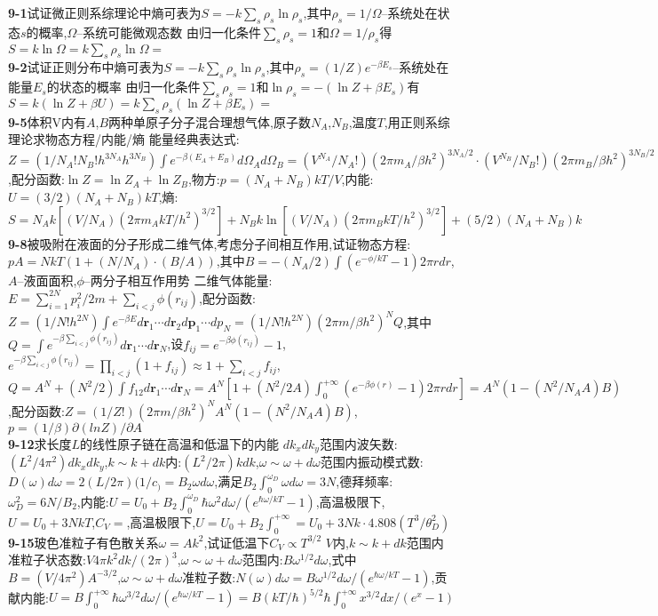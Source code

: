 \documentclass[10pt,a4paper]{article}
\begin{document}
\begin{multicols}{2}
\textbf{9-1}试证微正则系综理论中熵可表为$S=-k\sum_s\rho_s\ln\rho_s$,其中$\rho_s=1/\Omega$--系统处在状态$s$的概率,$\Omega$--系统可能微观态数\quad\quad
由归一化条件$\sum_s\rho_s=1$和$\Omega=1/\rho_s$得$S=k\ln\Omega=k\sum_s\rho_s\ln\Omega=$\\
\textbf{9-2}试证正则分布中熵可表为$S=-k\sum_s\rho_s\ln\rho_s$,其中$\rho_s=(1/Z)e^{-\beta E_s}$--系统处在能量$E_s$的状态的概率\quad\quad
由归一化条件$\sum_s\rho_s=1$和$\ln\rho_s=-(\ln Z+\beta E_s)$有$S=k(\ln Z+\beta U)=k\sum_s\rho_s(\ln Z+\beta E_s)=$\\
\textbf{9-5}体积V内有$A$,$B$两种单原子分子混合理想气体,原子数$N_A$,$N_B$,温度$T$,用正则系综理论求物态方程/内能/熵\quad\quad
能量经典表达式:$Z=(1/N_A!N_B!h^{3N_A}h^{3N_B})\int e^{-\beta(E_A+E_B)}d\Omega_Ad\Omega_B=(V^{N_A}/N_A!)(2\pi m_A/\beta h^2)^{3N_A/2}\cdot(V^{N_B}/N_B!)(2\pi m_B/\beta h^2)^{3N_B/2}$,配分函数:$\ln Z=\ln Z_A+\ln Z_B$,物方:$p=(N_A+N_B)kT/V$,内能:$U=(3/2)(N_A+N_B)kT$,熵:$S=N_Ak[(V/N_A)(2\pi m_AkT/h^2)^{3/2}]+N_Bk\ln[(V/N_A)(2\pi m_BkT/h^2)^{3/2}]+(5/2)(N_A+N_B)k$\\
\textbf{9-8}被吸附在液面的分子形成二维气体,考虑分子间相互作用,试证物态方程:$pA=NkT(1+(N/N_A)\cdot(B/A))$,其中$B=-(N_A/2)\int(e^{-\phi/kT}-1)2\pi rdr$,$A$--液面面积,$\phi$--两分子相互作用势\quad\quad
二维气体能量:$E=\sum_{i=1}^{2N}p_i^2/2m+\sum_{i<j}\phi(r_{ij})$,配分函数:$Z=(1/N!h^{2N})\int e^{-\beta E}d\bm{r}_1\cdots d\bm{r}_2d\bm{p}_1\cdots dp_N=(1/N!h^{2N})(2\pi m/\beta h^2)^NQ$,其中$Q=\int e^{-\beta\sum_{i<j}\phi(r_{ij})}d\bm{r}_1\cdots d\bm{r}_N$,设$f_{ij}=e^{-\beta\phi(r_{ij})}-1$,$e^{-\beta\sum_{i<j}\phi(r_{ij})}=\prod_{i<j}(1+f_{ij})\approx1+\sum_{i<j}f_{ij}$,$Q=A^N+(N^2/2)\int f_{12}d\bm{r}_1\cdots d\bm{r}_N=A^N[1+(N^2/2A)\int_0^{+\infty}(e^{-\beta\phi(r)}-1)2\pi rdr]=A^N(1-(N^2/N_AA)B)$,配分函数:$Z=(1/Z!)(2\pi m/\beta h^2)^NA^N(1-(N^2/N_AA)B)$,$p=(1/\beta)\partial(ln Z)/\partial A$\\
\textbf{9-12}求长度$L$的线性原子链在高温和低温下的内能\quad\quad
$dk_xdk_y$范围内波矢数:$(L^2/4\pi^2)dk_xdk_y$,$k\sim k+dk$内:$(L^2/2\pi)kdk$,$\omega\sim\omega+d\omega$范围内振动模式数:$D(\omega)d\omega=2(L/2\pi)(1/c_)=B_2\omega d\omega$,满足$B_2\int_0^{\omega_D}\omega d\omega=3N$,德拜频率:$\omega_D^2=6N/B_2$,内能:$U=U_0+B_2\int_0^{\omega_D}\hbar\omega^2d\omega/(e^{\hbar\omega/kT}-1)$,高温极限下,$U=U_0+3NkT$,$C_V=$,高温极限下,$U=U_0+B_2\int_0^{+\infty}=U_0+3Nk\cdot4.808(T^3/\theta_D^2)$\\
\textbf{9-15}玻色准粒子有色散关系$\omega=Ak^2$,试证低温下$C_V\propto T^{3/2}$\quad\quad
$V$内,$k\sim k+dk$范围内准粒子状态数:$V4\pi k^2dk/(2\pi)^3$,$\omega\sim\omega+d\omega$范围内:$B\omega^{1/2}d\omega$,式中$B=(V/4\pi^2)A^{-3/2}$,$\omega\sim\omega+d\omega$准粒子数:$N(\omega)d\omega=B\omega^{1/2}d\omega/(e^{\hbar\omega/kT}-1)$,贡献内能:$U=B\int_0^{+\infty}\hbar\omega^{3/2}d\omega/(e^{\hbar\omega/kT}-1)=B(kT/\hbar)^{5/2}\hbar\int_0^{+\infty}x^{3/2}dx/(e^x-1)$\\

\end{multicols}
\end{document}
